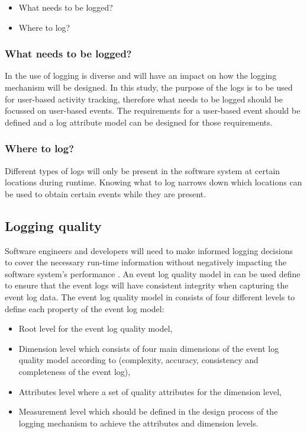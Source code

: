 \begin{itemize}
	\item What needs to be logged?
	\item Where to log?
\end{itemize}

\subsubsection{What needs to be logged?}
In  the use of logging is diverse and will have an impact on how the logging mechanism will be designed. In this study, the purpose of the logs is to be used for user-based activity tracking, therefore what needs to be logged should be focussed on user-based events. The requirements for a user-based event should be defined and a log attribute model can be designed for those requirements.

\subsubsection{Where to log?}
Different types of logs will only be present in the software system at certain locations during runtime. Knowing what to log narrows down which locations can be used to obtain certain events while they are present.

\clearpage

\subsection{Logging quality}\label{sec:ch1_loggingQuality}

Software engineers and developers will need to make informed logging decisions to cover the necessary run-time information without negatively impacting the software system's performance \cite{Zhu2015, Zhu2019, Kherbouche2017}. An event log quality model in  can be used define to ensure that the event logs will have consistent integrity when capturing the event log data. The event log quality model in  consists of four different levels to define each property of the event log model:

\begin{itemize}
	\item Root level for the event log quality model,
	\item Dimension level which consists of four main dimensions of the event log quality model according to \cite{Kherbouche2017} (complexity, accuracy, consistency and completeness of the event log),
	\item Attributes level where a set of quality attributes for the dimension level,
	\item Measurement level which should be defined in the design process of the logging mechanism to achieve the attributes and dimension levels.
\end{itemize}

